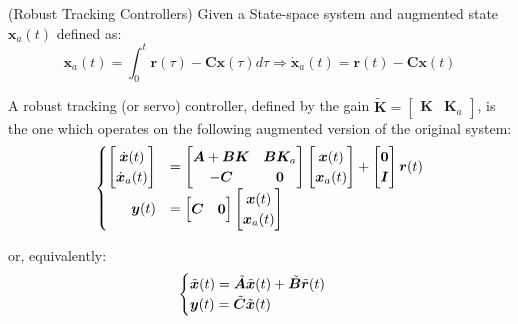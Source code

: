 \documentclass[a4paper,11pt]{book}
\numberwithin{figure}{chapter}
\numberwithin{equation}{chapter}
\numberwithin{table}{chapter}
\theoremstyle{definition}
\newtheorem{definition}{Definition}[chapter]
\newcounter{boxed-theorem}
\newcounter{boxed-definition}
\newenvironment{boxed-definition}[1]
{\begin{shaded} \begin{definition}{#1}}
{\end{definition} \end{shaded}}
\begin{document}
\begin{boxed-definition}{(Robust Tracking Controllers)} \label{def:robustTracking}
	Given a State-space system and augmented state $\bm{x}_a(t)$ defined as:
	\begin{equation}
		\bm{x}_a(t) = \int_{0}^{t} \bm{r}(\tau) - \bm{C} \bm{x}(\tau) d\tau \Longrightarrow \dot{\bm{x}}_a(t) = \bm{r}(t) - \bm{C} \bm{x}(t)
	\end{equation}
	
	A robust tracking (or servo) controller, defined by the gain $\tilde{\bm{K}} = \begin{bmatrix} \bm{K} & \bm{K}_a \end{bmatrix}$, is the one which operates on the following augmented version of the original system:
	\begin{align} \label{eq:augmentedSystem}
	\begin{cases}
		\begin{bmatrix}
			\dot{\bm{x}}(t) \\
			\dot{\bm{x}}_a(t)
		\end{bmatrix} &= \begin{bmatrix}
			\bm{A} + \bm{B} \bm{K} & \bm{B} \bm{K}_a \\ - \bm{C} & \bm{0}
		\end{bmatrix} \begin{bmatrix}
			\bm{x}(t) \\
			\bm{x}_a(t)
		\end{bmatrix} + \begin{bmatrix}
			\bm{0} \\
			\bm{I}
		\end{bmatrix} \bm{r}(t)
		\\
		\hfill \bm{y}(t) &= \begin{bmatrix}
			\bm{C} & \bm{0}
		\end{bmatrix} \begin{bmatrix}
			\bm{x}(t) \\
			\bm{x}_a(t)
		\end{bmatrix}
	\end{cases}
	\end{align}
	
	or, equivalently:
	\begin{align}
	\begin{cases}
		\tilde{\bm{x}}(t) = \tilde{\bm{A}} \tilde{\bm{x}}(t) + \tilde{\bm{B}} \tilde{\bm{r}}(t) \\
		\bm{y}(t) = \tilde{\bm{C}} \tilde{\bm{x}}(t) \hfill
	\end{cases}
	\end{align}
\end{boxed-definition}
\end{document}

